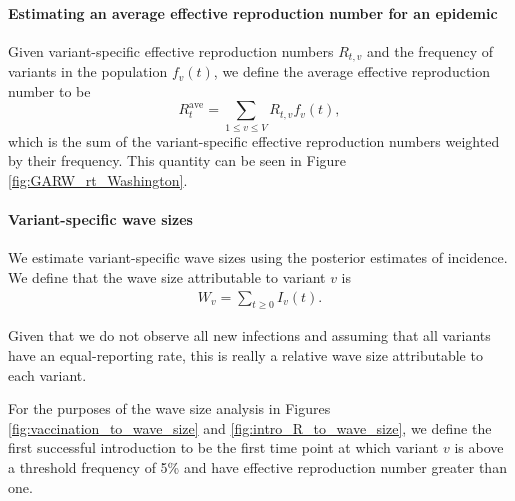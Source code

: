 \documentclass[11pt,oneside,letterpaper]{article}
\def\tbc#1{\textcolor{purple}{[#1]}}
\begin{document}
\paragraph{Estimating an average effective reproduction number for an epidemic}

Given variant-specific effective reproduction numbers $R_{t,v}$ and the frequency of variants in the population $f_{v}(t)$, we define the average effective reproduction number to be
\begin{equation}
  R_{t}^{\text{ave}} = \sum_{1\leq v \leq V} R_{t,v}f_{v}(t),
\end{equation}
which is the sum of the variant-specific effective reproduction numbers weighted by their frequency. This quantity can be seen in Figure \ref{fig:GARW_rt_Washington}.

\paragraph{Variant-specific wave sizes}%

We estimate variant-specific wave sizes using the posterior estimates of incidence. We define that the wave size attributable to variant $v$ is
 \begin{align*}
   W_{v} = \sum_{t \geq 0} I_{v}(t).
\end{align*}

Given that we do not observe all new infections and assuming that all variants have an equal-reporting rate, this is really a relative wave size attributable to each variant.

For the purposes of the wave size analysis in Figures \ref{fig:vaccination_to_wave_size} and \ref{fig:intro_R_to_wave_size}, we define the first successful introduction to be the first time point at which variant $v$ is above a threshold frequency of 5\% and have effective reproduction number greater than one.

\end{document}
